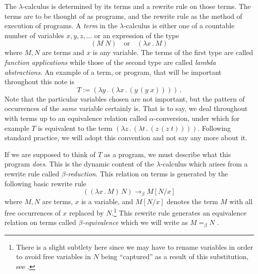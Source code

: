 \documentclass[english,letter paper,12pt,reqno]{article}
\theoremstyle{example}
\numberwithin{equation}{section}
\begin{document}
The $\lambda$-calculus is determined by its terms and a rewrite rule on those terms. The terms are to be thought of as programs, and the rewrite rule as the method of execution of programs. A \emph{term} in the $\lambda$-calculus is either one of a countable number of variables $x,y,z,\ldots$ or an expression of the type
\begin{equation}
(M \; N) \quad \text{or} \quad (\lambda x\,.\, M)
\end{equation}
where $M,N$ are terms and $x$ is any variable. The terms of the first type are called \emph{function applications} while those of the second type are called \emph{lambda abstractions}. An example of a term, or program, that will be important throughout this note is
\begin{equation}
T := ( \lambda y \,.\, ( \lambda x \,.\, (y \,(y \; x))))\,.
\end{equation}
Note that the particular variables chosen are not important, but the pattern of occurrences of the \emph{same} variable certainly is. That is to say, we deal throughout with terms up to an equivalence relation called $\alpha$-conversion, under which for example $T$ is equivalent to the term $( \lambda z \,.\, ( \lambda t \,.\, (z \,(z \; t))))$. Following standard practice, we will adopt this convention and not say any more about it.

If we are supposed to think of $T$ as a program, we must describe what this program \emph{does}. This is the dynamic content of the $\lambda$-calculus which arises from a rewrite rule called \emph{$\beta$-reduction}. This relation on terms is generated by the following basic rewrite rule
\begin{equation}\label{eq:basic_beta_reduction}
( (\lambda x \,.\, M)\, N) \longrightarrow_\beta M[N/x]
\end{equation}
where $M,N$ are terms, $x$ is a variable, and $M[N/x]$ denotes the term $M$ with all free occurrences of $x$ replaced by $N$.\footnote{There is a slight subtlety here since we may have to rename variables in order to avoid free variables in $N$ being ``captured'' as a result of this substitution, see \cite[\S 2.3]{selinger}.} This rewrite rule generates an equivalence relation on terms called \emph{$\beta$-equivalence} which we will write as $M =_{\beta} N$ \cite[\S 2.5]{selinger}.
\end{document}

